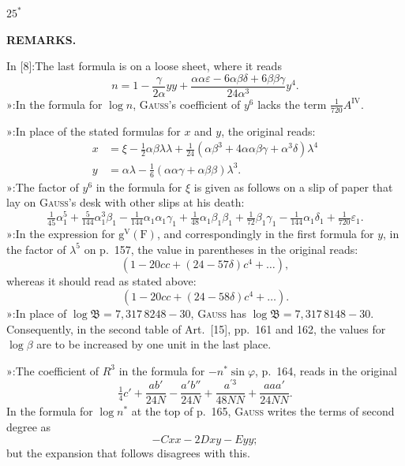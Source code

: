 \noindent\hfill \(25^{*}\)\hspace*{.12\linewidth}\par

\par\clearpage
\noindent{}\hfill{\small\textbf{REMARKS.}}\hfill\null\par\medskip

{\small
\noindent In [8]:\quad The last formula is on a loose sheet, where it reads
\[
n=1-\frac{\gamma}{2\alpha}yy+
\frac{\alpha\alpha\varepsilon-6\alpha\beta\delta+6\beta\beta\gamma}{24\alpha^3}y^4.
\]
\noindent »\quad [9]:\quad In the formula for \(\log n\), \textsc{Gauss}'s coefficient of \(y^6\) lacks the term \(\tfrac1{720}A^{\mathrm{IV}}\).

\noindent »\quad [11]:\quad In place of the stated formulas for \(x\) and \(y\), the original reads:
\[
\begin{aligned}
x&=\xi-\tfrac12\alpha\beta\lambda\lambda
+\tfrac1{24}(\alpha\beta^3+4\alpha\alpha\beta\gamma+\alpha^3\delta)\lambda^4\\
y&=\alpha\lambda-\tfrac16(\alpha\alpha\gamma+\alpha\beta\beta)\lambda^3.
\end{aligned}
\]
\noindent »\quad [12]:\quad The factor of \(y^6\) in the formula for \(\xi\) is given as follows on a slip of paper that lay on \textsc{Gauss}'s desk with other slips at his death:
\[
\tfrac1{45}\alpha_1^5+\tfrac5{144}\alpha_1^3\beta_1
-\tfrac1{144}\alpha_1\alpha_1\gamma_1+\tfrac1{48}\alpha_1\beta_1\beta_1
+\tfrac1{72}\beta_1\gamma_1-\tfrac1{144}\alpha_1\delta_1+\tfrac1{720}\varepsilon_1.
\]
\noindent »\quad [13]:\quad In the expression for \(\mathrm g^{\mathrm V}(\mathrm F)\),
and correspondingly in the first formula for \(y\), in the factor of \(\lambda^5\)
on p.\ 157, the value in parentheses in the original reads:
\[
(1-20cc+(24-57\delta)c^4+\ldots),
\]
\noindent whereas it should read as stated above:
\[
(1-20cc+(24-58\delta)c^4+\ldots).
\]
\noindent »\quad [15]:\quad In place of \(\log\mathfrak{B}=7{,}317\,8248-30\),
\textsc{Gauss} has \(\log\mathfrak{B}=7{,}317\,8148-30\). Consequently, in the
second table of Art.\ [15], pp.\ 161 and 162, the values for \(\log\beta\)
are to be increased by one unit in the last place.

\noindent »\quad [16]:\quad The coefficient of \(R^3\) in the formula for \(-n^*\sin\varphi\),
p.\ 164, reads in the original
\[
\tfrac14c'+\frac{ab'}{24N}-\frac{a'b''}{24N}
+\frac{a^{\prime3}}{48NN}+\frac{aaa'}{24NN}.
\]
\noindent In the formula for \(\log n^*\) at the top of p.\ 165, \textsc{Gauss}
writes the terms of second degree as
\[
-Cxx-2Dxy-Eyy;
\]
\noindent but the expansion that follows disagrees with this.

}
